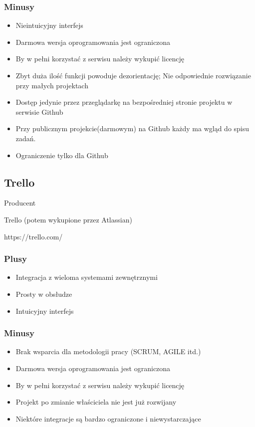 \documentclass[eng,printmode]{mgr}
\begin{document}
\subsubsection{Minusy}
\begin{itemize}
  \item[--] Nieintuicyjny interfejs
  \item[--] Darmowa wersja oprogramowania jest ograniczona
  \item[--] By w pełni korzystać z serwisu należy wykupić licencję
  \item[--] Zbyt duża ilość funkcji powoduje dezorientację; Nie odpowiednie rozwiązanie przy małych projektach
  \item[--] Dostęp jedynie przez przeglądarkę na bezpośredniej stronie projektu w serwisie Github
  \item[--] Przy publicznym projekcie(darmowym) na Github każdy ma wgląd do spisu zadań.
  \item[--] Ograniczenie tylko dla Github
\end{itemize}

\subsection{Trello}
\begin{labeling}{Producent}
\item [Producent:] Trello (potem wykupione przez Atlassian)
\item [Link:] https://trello.com/
\end{labeling}
\subsubsection{Plusy}
\begin{itemize}
  \item[--] Integracja z wieloma systemami zewnętrznymi
  \item[--] Prosty w obsłudze
  \item[--] Intuicyjny interfejs
\end{itemize}
\subsubsection{Minusy}
\begin{itemize}
  \item[--] Brak wsparcia dla metodologii pracy (SCRUM, AGILE itd.)
  \item[--] Darmowa wersja oprogramowania jest ograniczona
  \item[--] By w pełni korzystać z serwisu należy wykupić licencję
  \item[--] Projekt po zmianie właściciela nie jest już rozwijany
  \item[--] Niektóre integracje są bardzo ograniczone i niewystarczające
\end{itemize}
\end{document}
